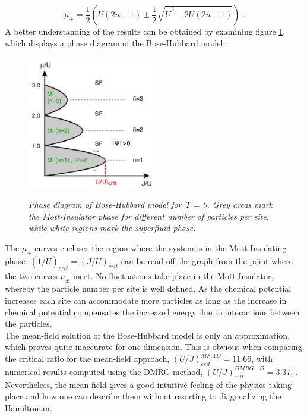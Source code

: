 \begin{equation}
	\bar{\mu}_{\pm} = \frac{1}{2} \left( \bar{U}(2n -1) \pm \frac{1}{2} \sqrt{\bar{U}^2 - 2 \bar{U} (2 n +1)} \right) \; .
\end{equation}
A better understanding of the results can be obtained by examining figure \ref{fig:SFMOTT}, which displays a phase diagram of the Bose-Hubbard model.  
\begin{figure}[h]
	\centering
	\includegraphics[width = 0.5\textwidth]{Figures/SFMottPhase.pdf}
	\label{fig:SFMOTT}
	\caption{\textit{Phase diagram of Bose-Hubbard model for T = 0. Grey areas mark the Mott-Insulator phase for different number of particles per site, while white regions mark the superfluid phase. \cite{greiner}}}
\end{figure}
The $\mu_{\pm}$ curves encloses the region where the system is in the Mott-Insulating phase. $(1/\bar{U})_{crit} = (J/U)_{crit}$ can be read off the graph from the point where the two curves $\mu_{\pm}$ meet. No fluctuations take place in the Mott Insulator, whereby the particle number per site is well defined. As the chemical potential increases each site can accommodate more particles as long as the increase in chemical potential compensates the increased energy due to interactions between the particles.\\
The mean-field solution of the Bose-Hubbard model is only an approximation, which proves quite inaccurate for one dimension. This is obvious when comparing the critical ratio for the mean-field approach, $\left( U/J \right)_{crit}^{MF,1D} = 11.66$, with numerical results computed using the DMRG method, $\left( U/J \right)_{crit}^{DMRG,1D} = 3.37$, \cite{Kuhner2000}. Nevertheless, the mean-field gives a good intuitive feeling of the physics taking place and how one can describe them without resorting to diagonalizing the Hamiltonian.\\